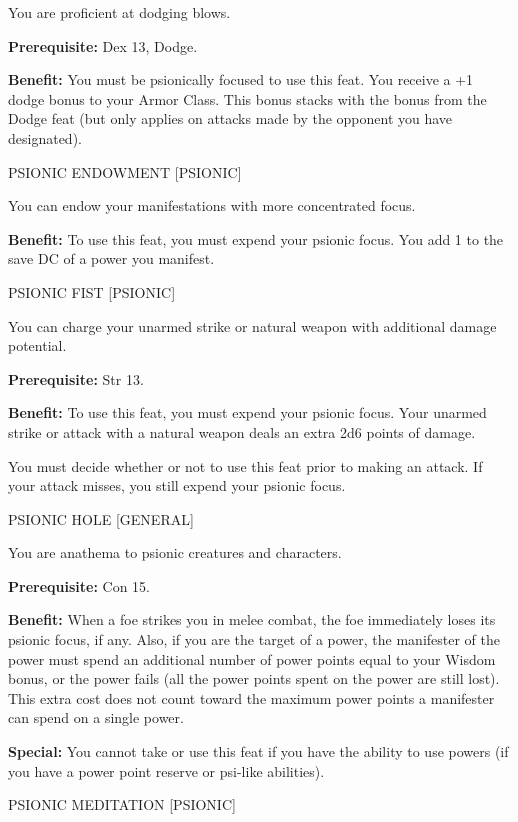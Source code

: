 \documentclass{article}
\begin{document}
You are proficient at dodging blows.

\textbf{Prerequisite:} Dex 13, Dodge.

\textbf{Benefit:} You must be psionically focused to use this feat. You receive 
a +1 dodge bonus to your Armor Class. This bonus stacks with the bonus from the 
Dodge feat (but only applies on attacks made by the opponent you have designated).

\vspace{12pt}
PSIONIC ENDOWMENT [PSIONIC]

You can endow your manifestations with more concentrated focus.

\textbf{Benefit:} To use this feat, you must expend your psionic focus. You add 
1 to the save DC of a power you manifest.

\vspace{12pt}
PSIONIC FIST [PSIONIC]

You can charge your unarmed strike or natural weapon with additional damage potential.

\textbf{Prerequisite:} Str 13.

\textbf{Benefit:} To use this feat, you must expend your psionic focus. Your unarmed 
strike or attack with a natural weapon deals an extra 2d6 points of damage.

You must decide whether or not to use this feat prior to making an attack. If your 
attack misses, you still expend your psionic focus.

\vspace{12pt}
PSIONIC HOLE [GENERAL]

You are anathema to psionic creatures and characters.

\textbf{Prerequisite:} Con 15.

\textbf{Benefit:} When a foe strikes you in melee combat, the foe immediately loses 
its psionic focus, if any. Also, if you are the target of a power, the manifester 
of the power must spend an additional number of power points equal to your Wisdom 
bonus, or the power fails (all the power points spent on the power are still lost). 
This extra cost does not count toward the maximum power points a manifester can 
spend on a single power.

\textbf{Special:} You cannot take or use this feat if you have the ability to use 
powers (if you have a power point reserve or psi-like abilities).

\vspace{12pt}
PSIONIC MEDITATION [PSIONIC]
\end{document}
